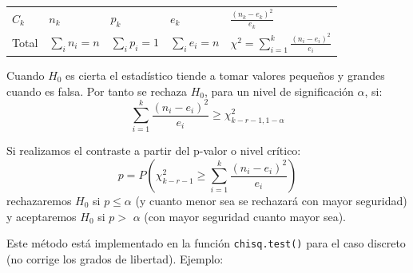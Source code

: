 \documentclass[
]{book}
\theoremstyle{break}
\theoremstyle{definition}
\theoremstyle{definition}
\theoremstyle{definition}
\theoremstyle{remark}
\begin{document}
\begin{longtable}[]{@{}lllll@{}}
\begin{minipage}[t]{0.06\columnwidth}\raggedright
\(C_{k}\)\strut
\end{minipage} & \begin{minipage}[t]{0.17\columnwidth}\raggedright
\(n_{k}\)\strut
\end{minipage} & \begin{minipage}[t]{0.17\columnwidth}\raggedright
\(p_{k}\)\strut
\end{minipage} & \begin{minipage}[t]{0.17\columnwidth}\raggedright
\(e_{k}\)\strut
\end{minipage} & \begin{minipage}[t]{0.29\columnwidth}\raggedright
\(\frac{(n_{k}-e_{k})^2}{e_{k}}\)\strut
\end{minipage}\tabularnewline
\begin{minipage}[t]{0.06\columnwidth}\raggedright
Total\strut
\end{minipage} & \begin{minipage}[t]{0.17\columnwidth}\raggedright
\(\sum_{i}n_{i}=n\)\strut
\end{minipage} & \begin{minipage}[t]{0.17\columnwidth}\raggedright
\(\sum_{i}p_{i}=1\)\strut
\end{minipage} & \begin{minipage}[t]{0.17\columnwidth}\raggedright
\(\sum_{i}e_{i}=n\)\strut
\end{minipage} & \begin{minipage}[t]{0.29\columnwidth}\raggedright
\(\chi^2=\sum_{i=1}^{k}\frac{(n_{i}-e_{i})^2}{e_{i}}\)\strut
\end{minipage}\tabularnewline
\bottomrule
\end{longtable}

Cuando \(H_0\) es cierta el estadístico tiende a tomar valores pequeños y grandes cuando es falsa.
Por tanto se rechaza \(H_0\), para un nivel de significación \(\alpha\), si:
\[\sum_{i=1}^{k}\frac{(n_{i}-e_{i})^2}{e_{i}}\geq \chi_{k-r-1,1-\alpha}^2\]

Si realizamos el contraste a partir del p-valor o nivel crítico:
\[p=P\left(  {\chi_{k-r-1}^2\geq \sum \limits_{i=1}^{k}{\frac{(n_{i}-e_{i})^2}{e_{i}}}}\right)\]
rechazaremos \(H_0\) si \(p\leq \alpha\) (y cuanto menor sea se rechazará con mayor seguridad) y aceptaremos \(H_0\) si \(p>\) \(\alpha\) (con mayor seguridad cuanto mayor sea).

Este método está implementado en la función \texttt{chisq.test()} para el caso discreto (no corrige los grados de libertad).
Ejemplo:
\end{document}
